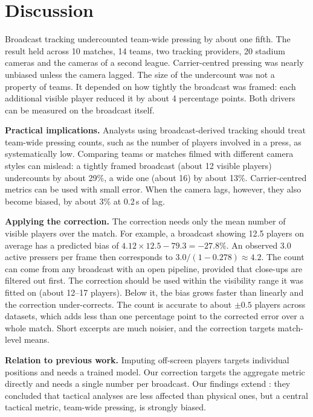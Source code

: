 \documentclass[11pt]{article}
\begin{document}
\section{Discussion}

Broadcast tracking undercounted team-wide pressing by about one fifth. The result held across 10 matches, 14 teams,
two tracking providers, 20 stadium cameras and the cameras of a second league. Carrier-centred pressing was nearly
unbiased unless the camera lagged. The size of the undercount was not a property of teams. It depended on how tightly
the broadcast was framed: each additional visible player reduced it by about 4 percentage points. Both drivers can be
measured on the broadcast itself.

\textbf{Practical implications.} Analysts using broadcast-derived tracking should treat team-wide pressing counts,
such as the number of players involved in a press, as systematically low. Comparing teams or matches filmed with
different camera styles can mislead: a tightly framed broadcast (about 12 visible players) undercounts by about 29\%,
a wide one (about 16) by about 13\%. Carrier-centred metrics can be used with small error. When the camera lags,
however, they also become biased, by about 3\% at 0.2\,s of lag.

\textbf{Applying the correction.} The correction needs only the mean number of visible players over the match.
For example, a broadcast showing 12.5 players on average has a predicted bias of
$4.12 \times 12.5 - 79.3 = -27.8\%$. An observed 3.0 active pressers per frame then corresponds to
$3.0 / (1 - 0.278) \approx 4.2$. The count can come from any broadcast with an open pipeline, provided that close-ups
are filtered out first. The correction should be used within the visibility range it was fitted on (about 12--17
players). Below it, the bias grows faster than linearly and the correction under-corrects. The count is accurate to
about $\pm 0.5$ players across datasets, which adds less than one percentage point to the corrected error over a
whole match. Short excerpts are much noisier, and the correction targets match-level means.

\textbf{Relation to previous work.} Imputing off-screen players \citep{omidshafiei2022graphimputer,offscreen2026}
targets individual positions and needs a trained model. Our correction targets the aggregate metric directly and
needs a single number per broadcast. Our findings extend \citet{smf2025broadcast}: they concluded that tactical
analyses are less affected than physical ones, but a central tactical metric, team-wide pressing, is strongly
biased.
\end{document}
